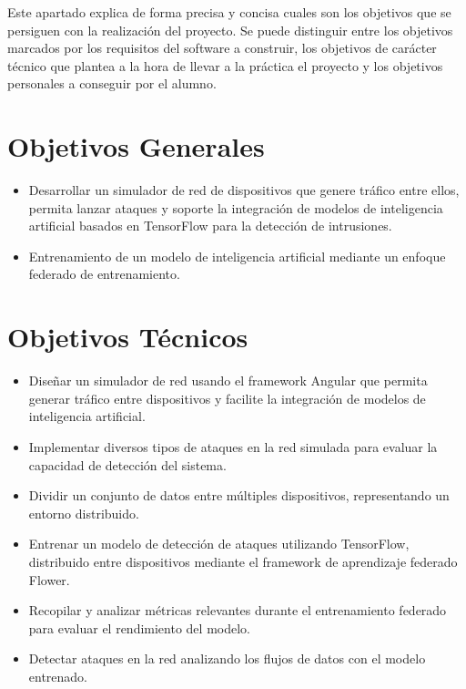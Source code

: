 
Este apartado explica de forma precisa y concisa cuales son los objetivos que se persiguen con la realización del proyecto. Se puede distinguir entre los objetivos marcados por los requisitos del software a construir, los objetivos de carácter técnico que plantea a la hora de llevar a la práctica el proyecto y los objetivos personales a conseguir por el alumno.

\section{Objetivos Generales}
\label{sec:ObjetivosGenerales}
\begin{itemize}
    \item Desarrollar un simulador de red de dispositivos que genere tráfico entre ellos, permita lanzar ataques y soporte la integración de modelos de inteligencia artificial basados en TensorFlow para la detección de intrusiones.
    \item Entrenamiento de un modelo de inteligencia artificial mediante un enfoque federado de entrenamiento.
\end{itemize}

\section{Objetivos Técnicos}
\label{sec:ObjetivosTecnicos}
\begin{itemize}
    \item Diseñar un simulador de red usando el framework Angular que permita generar tráfico entre dispositivos y facilite la integración de modelos de inteligencia artificial.
    \item Implementar diversos tipos de ataques en la red simulada para evaluar la capacidad de detección del sistema.
    \item Dividir un conjunto de datos entre múltiples dispositivos, representando un entorno distribuido.
    \item Entrenar un modelo de detección de ataques utilizando TensorFlow, distribuido entre dispositivos mediante el framework de aprendizaje federado Flower.
    \item Recopilar y analizar métricas relevantes durante el entrenamiento federado para evaluar el rendimiento del modelo.
    \item Detectar ataques en la red analizando los flujos de datos con el modelo entrenado.
\end{itemize}

